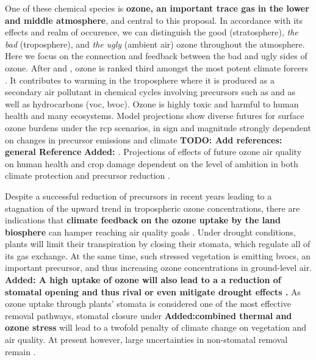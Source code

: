 One of these chemical species is \textbf{ozone, an important trace gas in the lower and middle atmosphere}, and central to this proposal. In accordance with its effects and realm of occurence, we can distinguish the good (stratosphere), \emph{the bad} (troposphere), and \emph{the ugly} (ambient air) ozone throughout the atmosphere. Here we focus on the connection and feedback between the bad and ugly sides of ozone. After  and , ozone is ranked third amongst the most potent climate forcers \parencite[Chapter 8]{IPCC2013}. It contributes to warming in the troposphere where it is produced as a secondary air pollutant in chemical cycles involving precursors such as  and  as well as hydrocarbons (\gls{voc}, \gls{bvoc}). Ozone is highly toxic and harmful to human health and many ecosystems. Model projections show diverse futures for surface ozone burdens under the \gls{rcp} scenarios, in sign and magnitude strongly dependent on changes in precursor emissions and climate \textbf{\color{red}TODO: Add references: general Reference} \textbf{\color{blue}Added: \parencites{JGR:Rieder2015}{AE:Rieder2018}{Nat:Skeie2020}}. Projections of effects of future ozone air quality on human health and crop damage dependent on the level of ambition in both climate protection and precursor reduction \parencite{PTRS:Schneidemesser2020}.

Despite a successful reduction of precursors in recent years leading to a stagnation of the upward trend in tropospheric ozone concentrations, there are indications that \textbf{climate feedback on the ozone uptake by the land biosphere} can hamper reaching air quality goals \parencite{NCC:Lin2020}. Under drought conditions, plants will limit their transpiration by closing their stomata, which regulate all of its gas exchange. At the same time, such stressed vegetation is emitting \glspl{bvoc}, an important precursor, and thus increasing ozone concentrations \ch{[O_3]} in ground-level air. \textbf{\color{blue}Added: A high uptake of ozone will also lead to a a reduction of stomatal opening and thus rival or even mitigate drought effects \parencite{BGS:Peron2021}.} As ozone uptake through plants’ stomata is considered one of the most effective removal pathways, stomatal closure under \textbf{\color{blue}Added:combined thermal and ozone stress} will lead to a twofold penalty of climate change on vegetation and air quality. At present however, large uncertainties in non-stomatal removal remain \parencite{RG:Clifton2020}.

